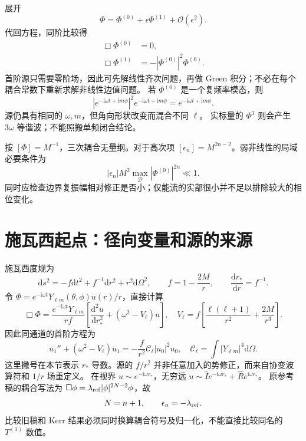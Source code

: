 \documentclass[UTF8,fontset=fandol,11pt,a4paper]{ctexart}
\newcommand{\ii}{\mathrm{i}}
\newcommand{\dd}{\mathrm{d}}
\newcommand{\calO}{\mathcal O}
\numberwithin{equation}{section}
\begin{document}
展开
\begin{equation}
\Phi=\Phi^{(0)}+\epsilon\Phi^{(1)}+\calO(\epsilon^2).
\end{equation}
代回方程，同阶比较得
\begin{align}
\Box\Phi^{(0)}&=0,\\
\Box\Phi^{(1)}&=-|\Phi^{(0)}|^2\Phi^{(0)}.
\end{align}
首阶源只需要零阶场，因此可先解线性齐次问题，再做 Green 积分；不必在每个耦合常数下重新求解非线性边值问题。
若 $\Phi^{(0)}$ 是一个复频率模态，则
\begin{equation}
|e^{-\ii\omega t+\ii m\phi}|^2 e^{-\ii\omega t+\ii m\phi}
=e^{-\ii\omega t+\ii m\phi}.
\end{equation}
源仍具有相同的 $\omega,m$，但角向形状改变而混合不同 $\ell$。
实标量的 $\Phi^3$ 则会产生 $3\omega$ 等谐波；不能照搬单频闭合结论。

按 $[\Phi]=M^{-1}$，三次耦合无量纲。对于高次项
$[\epsilon_n]=M^{2n-2}$。弱非线性的局域必要条件为
\begin{equation}
|\epsilon_n|M^2\max_{\mathcal D}|\Phi^{(0)}|^{2n}\ll1.
\end{equation}
同时应检查边界复振幅相对修正是否小；仅能流的实部很小并不足以排除较大的相位变化。

\section{施瓦西起点：径向变量和源的来源}
施瓦西度规为
\begin{equation}
\dd s^2=-f\dd t^2+f^{-1}\dd r^2+r^2\dd\Omega^2,\qquad f=1-\frac{2M}{r},
\qquad\frac{\dd r_*}{\dd r}=f^{-1}.
\end{equation}
令 $\Phi=e^{-\ii\omega t}Y_{\ell m}(\theta,\phi)u(r)/r$，直接计算
\begin{equation}
\Box\Phi=\frac{e^{-\ii\omega t}Y_{\ell m}}{rf}
\left[\frac{\dd^2u}{\dd r_*^2}+
\left(\omega^2-V_\ell\right)u\right],
\quad V_\ell=f\left[\frac{\ell(\ell+1)}{r^2}+\frac{2M}{r^3}\right].
\end{equation}
因此同通道的首阶方程为
\begin{equation}
u_1''+(\omega^2-V_\ell)u_1
=-\frac{f}{r^2}\mathcal C_\ell |u_0|^2u_0,
\quad \mathcal C_\ell=\int |Y_{\ell m}|^4\dd\Omega.
\end{equation}
这里撇号在本节表示 $r_*$ 导数。源的 $f/r^2$ 并非任意加入的势修正，而来自协变波算符和 $1/r$ 场重定义。
在视界 $u\sim e^{-\ii\omega r_*}$，无穷远
$u\sim\widehat I e^{-\ii\omega r_*}+\widehat R e^{\ii\omega r_*}$。
原参考稿的耦合写法为 $\Box\phi=\lambda_{\rm ref}|\phi|^{2N-2}\phi$，故
\begin{equation}N=n+1,\qquad \epsilon_n=-\lambda_{\rm ref}.\end{equation}
比较旧稿和 Kerr 结果必须同时换算耦合符号及归一化，不能直接比较同名的 $T^{(1)}$ 数值。
\end{document}
